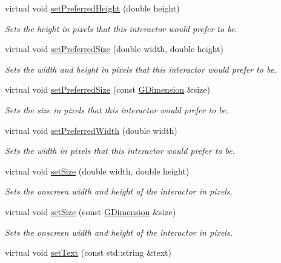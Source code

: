 \begin{DoxyCompactItemize}
virtual void \mbox{\hyperlink{classGInteractor_a1ab987704fce32098706c6f00fb08218}{set\+Preferred\+Height}} (double height)
\begin{DoxyCompactList}\small\item\em Sets the height in pixels that this interactor would prefer to be. \end{DoxyCompactList}\item 
virtual void \mbox{\hyperlink{classGInteractor_a042c5ae19430d765ef552371cae3632c}{set\+Preferred\+Size}} (double width, double height)
\begin{DoxyCompactList}\small\item\em Sets the width and height in pixels that this interactor would prefer to be. \end{DoxyCompactList}\item 
virtual void \mbox{\hyperlink{classGInteractor_aa22d9be4bc0e078bb0ea69b0fc9d7c75}{set\+Preferred\+Size}} (const \mbox{\hyperlink{classGDimension}{G\+Dimension}} \&size)
\begin{DoxyCompactList}\small\item\em Sets the size in pixels that this interactor would prefer to be. \end{DoxyCompactList}\item 
virtual void \mbox{\hyperlink{classGInteractor_a3db429ab2fa52efd187eec0ed8cdd9f2}{set\+Preferred\+Width}} (double width)
\begin{DoxyCompactList}\small\item\em Sets the width in pixels that this interactor would prefer to be. \end{DoxyCompactList}\item 
virtual void \mbox{\hyperlink{classGInteractor_aca25d49481f9bf5fc8f7df4c086c4ce7}{set\+Size}} (double width, double height)
\begin{DoxyCompactList}\small\item\em Sets the onscreen width and height of the interactor in pixels. \end{DoxyCompactList}\item 
virtual void \mbox{\hyperlink{classGInteractor_ae2b628228f192c2702c4ce941b2af68f}{set\+Size}} (const \mbox{\hyperlink{classGDimension}{G\+Dimension}} \&size)
\begin{DoxyCompactList}\small\item\em Sets the onscreen width and height of the interactor in pixels. \end{DoxyCompactList}\item 
virtual void \mbox{\hyperlink{classGButton_ac1ae51949d41ee9054634be5967d91b8}{set\+Text}} (const std\+::string \&text)

\end{DoxyCompactItemize}
